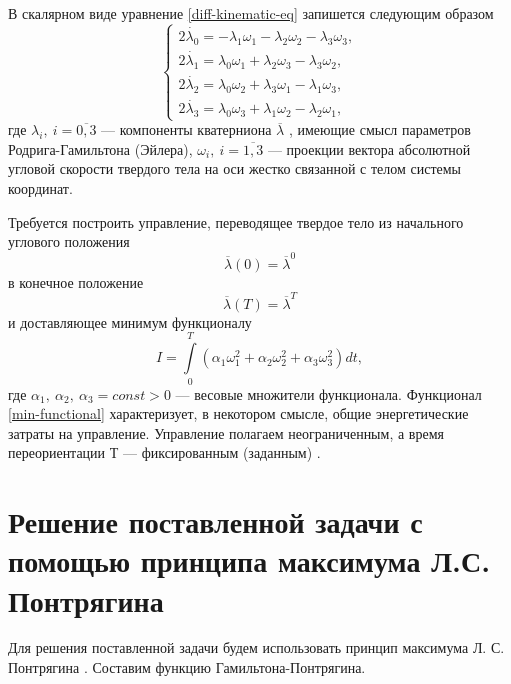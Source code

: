 \documentclass[14pt]{extreport}
\begin{document}
В скалярном виде уравнение \eqref{diff-kinematic-eq} запи­шется следующим образом
\begin{equation}
\label{diff-kinematic-eq-scal}
\begin{cases}
	2\dot{\lambda_{0}} = -\lambda_{1}\omega_{1} - \lambda_{2}\omega_{2} - \lambda_{3}\omega_{3},\\
	2\dot{\lambda_{1}} = \lambda_{0}\omega_{1} + \lambda_{2}\omega_{3} - \lambda_{3}\omega_{2},\\
	2\dot{\lambda_{2}} = \lambda_{0}\omega_{2} + \lambda_{3}\omega_{1} - \lambda_{1}\omega_{3},\\
	2\dot{\lambda_{3}} = \lambda_{0}\omega_{3} + \lambda_{1}\omega_{2} - \lambda_{2}\omega_{1},
\end{cases}
\end{equation}
где $\lambda_{i},\ i=\overline{0,3}$ — компоненты кватерниона $\overline{\lambda}$ , имеющие смысл пара­метров Родрига-Гамильтона (Эйлера), $\omega_{i},\ i=\overline{1,3}$ — проекции вектора абсолютной угловой скорости твердого тела на оси жестко связанной с те­лом системы координат. 

Требуется построить управление, переводящее твердое тело из начального углового положения
\begin{equation}
\label{init-angular-position}
\overline{\lambda}(0) = \overline{\lambda}^{0}
\end{equation}
в конечное положение
\begin{equation}
\label{fin-angular-position}
\overline{\lambda}(T) = \overline{\lambda}^{T}
\end{equation}
и доставляющее минимум функционалу
\begin{equation}
\label{min-functional}
I = \int \limits_{0}^{T} (\alpha_{1}\omega_{1}^{2}+\alpha_{2}\omega_{2}^{2}+\alpha_{3}\omega_{3}^{2}) dt,
\end{equation}
где $\alpha_{1},\ \alpha_{2},\ \alpha_{3} = const > 0$ — весовые множители функционала. Функционал \eqref{min-functional} характеризует, в некотором смысле, общие энергетические затраты на управление. Управление полагаем неограниченным, а время переориентации Т — фиксированным (заданным) \cite{sapunkov}.

\chapter{Решение поставленной задачи с помощью принципа максимума Л.С. Понтрягина}
Для решения поставленной задачи будем использовать принцип макси­мума Л. С. Понтрягина \cite{methods}. Составим функцию Гамильтона-Понтрягина.
\end{document}

